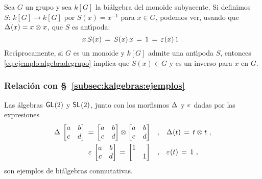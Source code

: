 \begin{ejemploAlgebraDeGrupo}\label{ejemplo:algebradegrupo}
	Sea $G$ un grupo y sea $k[G]$ la bi\'{a}lgebra del monoide subyacente.
	Si definimos $S:\,k[G]\rightarrow k[G]$ por $S(x)=x^{-1}$ para
	$x\in G$, podemos ver, usando que $\Delta_{}(x)=x\otimes_{} x$, que
	$S$ es ant\'{\i}poda:
	\begin{equation}
		\label{eq:ejemplo:algebradegrupo}
		x\,S(x) \,=\, S(x)\,x \,=\, 1 \,=\, \varepsilon_{}(x)\,1
		\text{ .}
	\end{equation}
	Rec\'{\i}procamente, si $G$ es un monoide y $k[G]$ admite una
	ant\'{\i}poda $S$, entonces \eqref{eq:ejemplo:algebradegrupo} implica
	que $S(x)\in G$ y es un inverso para $x$ en $G$.
\end{ejemploAlgebraDeGrupo}

\subsubsection{Relaci\'{o}n con \S~\ref{subsec:kalgebras:ejemplos}}

\begin{propoLinealGeneral}\label{propo:bialgebralinealgeneral}
	Las \'{a}lgebras $\mathsf{GL}_{}(2)$ y $\mathsf{SL}_{}(2)$, junto con los morfismos
	$\Delta_{}$ y $\varepsilon_{}$ dadas por las expresiones
	\begin{align*}
		\Delta_{}\,\begin{bmatrix} a & b \\ c & d \end{bmatrix} \,=\,
			\begin{bmatrix} a & b \\ c & d \end{bmatrix} \otimes_{}
			\begin{bmatrix} a & b \\ c & d \end{bmatrix}
			& \quad\text{,}\quad
			\Delta_{}(t) \,=\,t\otimes_{} t \text{ ,} \\
		\varepsilon_{}\,\begin{bmatrix} a & b \\ c & d \end{bmatrix} \,=\,
			\begin{bmatrix} 1 & \\ & 1 \end{bmatrix}
			& \quad\text{,}\quad
			\varepsilon_{}(t) \,=\,1
		\text{ ,}
	\end{align*}
	son ejemplos de bi\'{a}lgebras conmutativas.
\end{propoLinealGeneral}


